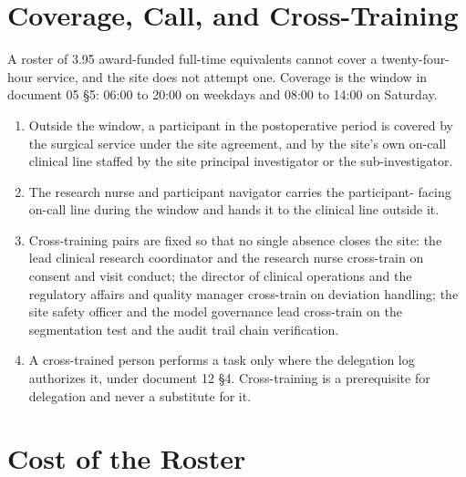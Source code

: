 \section{Coverage, Call, and Cross-Training}

A roster of 3.95 award-funded full-time equivalents cannot cover a
twenty-four-hour service, and the site does not attempt one. Coverage is the
window in document 05 §5: 06:00 to 20:00 on weekdays and 08:00 to 14:00 on
Saturday.

\begin{enumerate}
\item Outside the window, a participant in the postoperative period is covered
  by the surgical service under the site agreement, and by the site's own
  on-call clinical line staffed by the site principal investigator or the
  sub-investigator.

\item The research nurse and participant navigator carries the participant-
  facing on-call line during the window and hands it to the clinical line
  outside it.

\item Cross-training pairs are fixed so that no single absence closes the site:
  the lead clinical research coordinator and the research nurse cross-train on
  consent and visit conduct; the director of clinical operations and the
  regulatory affairs and quality manager cross-train on deviation handling; the
  site safety officer and the model governance lead cross-train on the
  segmentation test and the audit trail chain verification.

\item A cross-trained person performs a task only where the delegation log
  authorizes it, under document 12 §4. Cross-training is a prerequisite for
  delegation and never a substitute for it.
\end{enumerate}

\section{Cost of the Roster}


